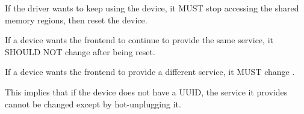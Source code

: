 If the driver wants to keep using the device, it MUST stop
accessing the shared memory regions, then reset the device.


If a device wants the frontend to continue to provide the same
service, it SHOULD NOT change  after being reset.

If a device wants the frontend to provide a different service,
it MUST change .

\begin{note}

This implies that if the device does not have a UUID, the
service it provides cannot be changed except by hot-unplugging
it.

\end{note}
